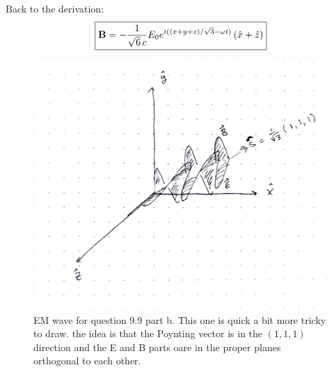 \documentclass[12pt]{article}
\begin{document}
\begin{enumerate}[label=\alph*)]
Back to the derivation:
\[\boxed{\vb{B} = -\frac{1}{\sqrt{6} \, c	}E_0 e^{i((x+y+z)/\sqrt{3} -\omega t)}\, (\hat{x} + \hat{z})}\]
\begin{figure}[!ht]
    \centering
    \label{fig:03_01}
    \caption{EM wave for question 9.9 part b. This one is quick a bit more tricky to draw. the idea is that the Poynting vector is in the $(1,1,1)$ direction and the E and B parts oare in the proper planes orthogonal to each other. }
    \includegraphics[width=.6\textwidth]{./hw09_03_02.pdf}
\end{figure}


\end{enumerate}
\end{document}
